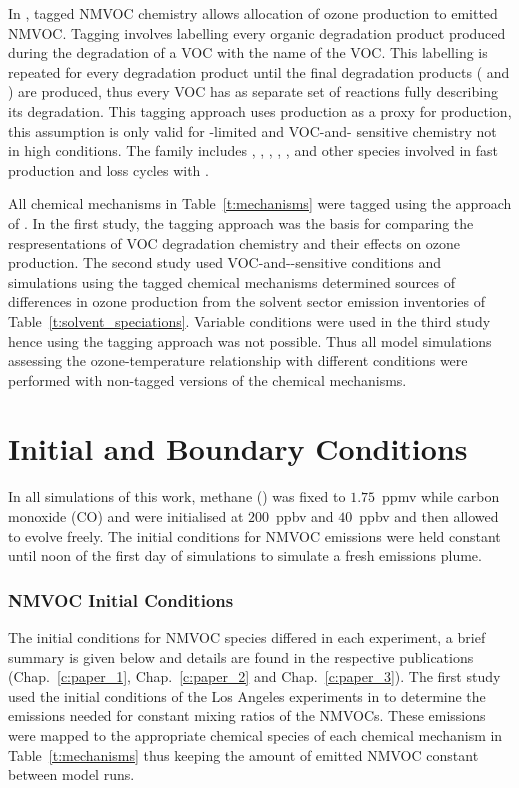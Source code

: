 In \citet{Butler:2011}, tagged NMVOC chemistry allows allocation of ozone production to emitted NMVOC.
Tagging involves labelling every organic degradation product produced during the degradation of a VOC with the name of the VOC.
This labelling is repeated for every degradation product until the final degradation products ( and ) are produced, thus every VOC has as separate set of reactions fully describing its degradation.
This tagging approach uses  production as a proxy for  production, this assumption is only valid for -limited and VOC-and- sensitive chemistry not in high  conditions.
The  family includes , , , , ,  and other species involved in fast production and loss cycles with .

All chemical mechanisms in Table~\ref{t:mechanisms} were tagged using the approach of \citet{Butler:2011}.
In the first study, the tagging approach was the basis for comparing the respresentations of VOC degradation chemistry and their effects on ozone production.
The second study used VOC-and--sensitive conditions and simulations using the tagged chemical mechanisms determined sources of differences in ozone production from the solvent sector emission inventories of Table~\ref{t:solvent_speciations}.
Variable  conditions were used in the third study hence using the tagging approach was not possible.
Thus all model simulations assessing the ozone-temperature relationship with different  conditions were performed with non-tagged versions of the chemical mechanisms.

\section{Initial and Boundary Conditions} \label{s:initial_conditions}
In all simulations of this work, methane () was fixed to $1.75$~ppmv while carbon monoxide (CO) and  were initialised at $200$~ppbv and $40$~ppbv and then allowed to evolve freely.
The initial conditions for NMVOC emissions were held constant until noon of the first day of simulations to simulate a fresh emissions plume.

\subsubsection{NMVOC Initial Conditions} 
The initial conditions for NMVOC species differed in each experiment, a brief summary is given below and details are found in the respective publications (Chap.~\ref{c:paper_1}, Chap.~\ref{c:paper_2} and Chap.~\ref{c:paper_3}).
The first study used the initial conditions of the Los Angeles experiments in \citet{Butler:2011} to determine the emissions needed for constant mixing ratios of the NMVOCs.
These emissions were mapped to the appropriate chemical species of each chemical mechanism in Table~\ref{t:mechanisms} thus keeping the amount of emitted NMVOC constant between model runs.

